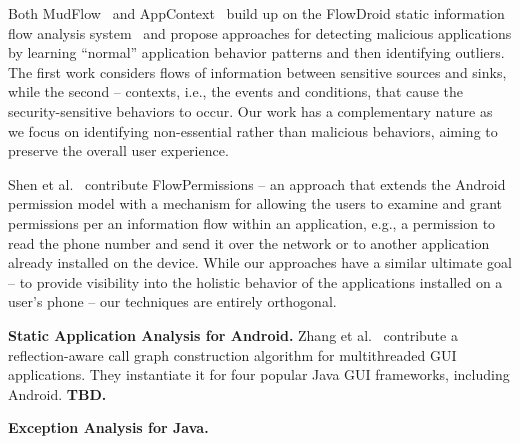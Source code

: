 Both MudFlow~\cite{Avdiienko:Kuznetsov:Gorla:Zeller:Arzt:Rasthofer:Bodden:ICSE15} and AppContext~\cite{Yang:Xiao:Andow:Li:Xie:Enck:ICSE15} build up on the FlowDroid static information flow analysis system~\cite{Arzt:Rasthofer:Fritz:Bodden:Bartel:Klein:Traon:Octeau:McDaniel:PLDI14} and propose approaches 
for detecting malicious applications by learning ``normal'' application behavior patterns and then identifying outliers. 
The first work considers flows of information between sensitive sources and sinks, while the second  -- contexts, i.e., the events and conditions, that cause the security-sensitive behaviors to occur. 
Our work has a complementary nature as we focus on identifying non-essential rather than malicious behaviors, aiming to preserve the overall user experience. 

Shen et al.~\cite{Shen:Vishnubhotla:Todarka:Arora:Dhandapani:Lehner:Ko:Ziarek:ASE14} contribute FlowPermissions -- 
an approach that extends the Android permission model with a mechanism for allowing the users to examine and grant permissions per an information flow within an application, e.g., a permission to read
the phone number and send it over the network or to another application already installed on the device. 
While our approaches have a similar ultimate goal -- to provide visibility into the holistic behavior of the applications installed on a user's phone -- our techniques are entirely orthogonal. 

\vspace{0.1in}
\noindent 
{\bf Static Application Analysis for Android.}
Zhang et al.~\cite{Zhang:Lue:Ernst:ISSTA12} contribute a reflection-aware call graph construction algorithm for 
multithreaded GUI applications. They instantiate it for four popular Java GUI frameworks, including Android. 
{\bf TBD.}

\vspace{0.1in}
\noindent 
{\bf Exception Analysis for Java.}

